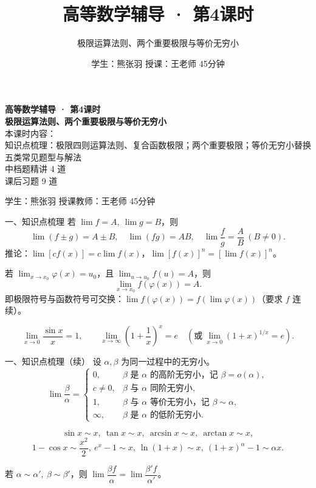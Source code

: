 \documentclass[aspectratio=169,11pt]{beamer}
\title{高等数学辅导 · 第4课时}
\subtitle{极限运算法则、两个重要极限与等价无穷小}
\author{学生：熊张羽 \quad 授课：王老师 \quad 45分钟}
\date{}
\begin{document}
\begin{frame}
\vspace{1.2cm}
{\color{navy}\bfseries\Huge 高等数学辅导 · 第4课时}\\[1.2em]
{\color{blacktext}\bfseries\LARGE 极限运算法则、两个重要极限与等价无穷小}\\[1.6em]
{\color{graytext}
本课时内容：\\[0.3em]
知识点梳理：极限四则运算法则、复合函数极限；两个重要极限；等价无穷小替换\\
五类常见题型与解法\\
中档题精讲 4 道\\
课后习题 9 道
}
\vspace{1.4em}

{\color{graytext} 学生：熊张羽 \quad 授课教师：王老师 \quad 45分钟}
\end{frame}

\begin{frame}{一、知识点梳理}
若 $\lim f=A,\ \lim g=B$，则
\[
\lim(f\pm g)=A\pm B,\quad \lim(fg)=AB,\quad \lim\frac fg=\frac AB\ (B\ne 0).
\]
推论：$\lim[cf(x)]=c\lim f(x)$，$\lim[f(x)]^n=[\lim f(x)]^n$。

若 $\lim_{x\to x_0}\varphi(x)=u_0$，且 $\lim_{u\to u_0}f(u)=A$，则
\[
\lim_{x\to x_0}f(\varphi(x))=A.
\]
即极限符号与函数符号可交换：$\lim f(\varphi(x))=f(\lim\varphi(x))$（要求 $f$ 连续）。

\[
\lim_{x\to 0}\frac{\sin x}{x}=1,
\qquad
\lim_{x\to\infty}\left(1+\frac1x\right)^x=e
\quad\left(\text{或}\ \lim_{x\to 0}(1+x)^{1/x}=e\right).
\]
\end{frame}

\begin{frame}{一、知识点梳理（续）}
设 $\alpha,\beta$ 为同一过程中的无穷小。
\[
\lim\frac\beta\alpha=
\begin{cases}
0, & \beta\text{ 是 }\alpha\text{ 的高阶无穷小，记 }\beta=o(\alpha),\\
c\ne 0, & \beta\text{ 与 }\alpha\text{ 同阶无穷小},\\
1, & \beta\text{ 与 }\alpha\text{ 等价无穷小，记 }\beta\sim\alpha,\\
\infty, & \beta\text{ 是 }\alpha\text{ 的低阶无穷小}.
\end{cases}
\]

\[
\sin x\sim x,\ \tan x\sim x,\ \arcsin x\sim x,\ \arctan x\sim x,
\]
\[
1-\cos x\sim \frac{x^2}{2},\ e^x-1\sim x,\ \ln(1+x)\sim x,\ (1+x)^\alpha-1\sim \alpha x.
\]

若 $\alpha\sim\alpha',\ \beta\sim\beta'$，则 $\lim\dfrac{\beta f}{\alpha}=\lim\dfrac{\beta' f}{\alpha'}$。
\end{frame}
\end{document}
